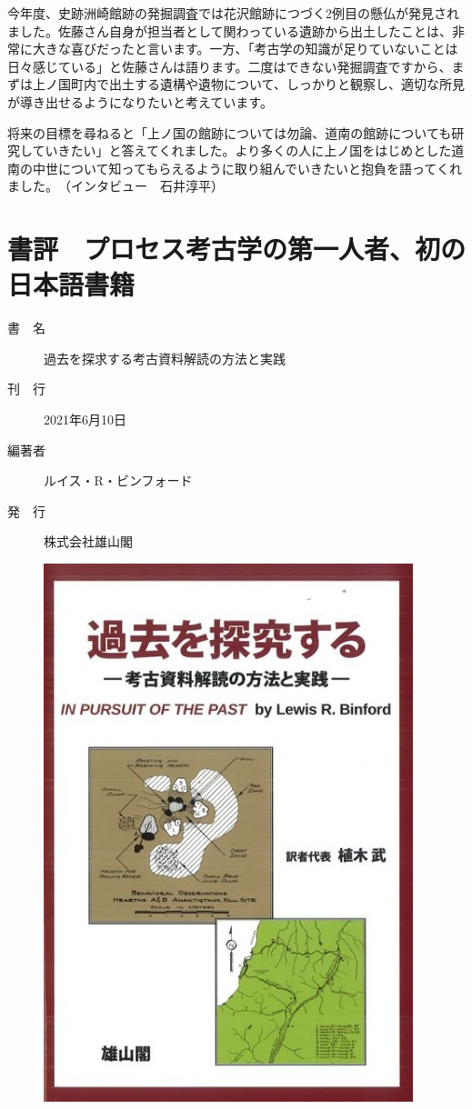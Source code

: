 \documentclass[a4j,11pt,twocolumn,openany]{jsbook}
\begin{document}
今年度、史跡洲崎館跡の発掘調査では花沢館跡につづく2例目の懸仏が発見されました。佐藤さん自身が担当者として関わっている遺跡から出土したことは、非常に大きな喜びだったと言います。一方、「考古学の知識が足りていないことは日々感じている」と佐藤さんは語ります。二度はできない発掘調査ですから、まずは上ノ国町内で出土する遺構や遺物について、しっかりと観察し、適切な所見が導き出せるようになりたいと考えています。

将来の目標を尋ねると「上ノ国の館跡については勿論、道南の館跡についても研究していきたい」と答えてくれました。より多くの人に上ノ国をはじめとした道南の中世について知ってもらえるように取り組んでいきたいと抱負を語ってくれました。　（インタビュー　石井淳平）

\chapter{書評　プロセス考古学の第一人者、初の日本語書籍}

\begin{description}
	\item[書　名]過去を探求する考古資料解読の方法と実践
	\item[刊　行]2021年6月10日
	\item[編著者]ルイス・R・ビンフォード
	\item[発　行]株式会社雄山閣
\end{description}

\begin{figure}[H]
	\centering
	\includegraphics[width=0.8\linewidth]{fig/09_Shohyo/Binford.jpg}
	\label{}
\end{figure}
\end{document}
